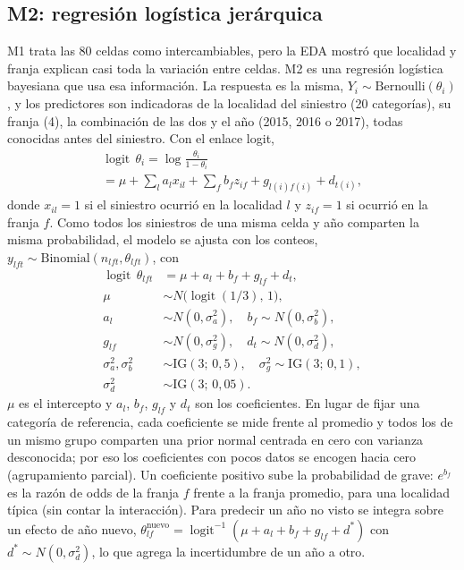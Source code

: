 \documentclass[10pt,twocolumn]{article}
\newcommand{\logit}{\operatorname{logit}}
\newcommand{\expit}{\operatorname{logit}^{-1}}
\begin{document}
\subsection{M2: regresión logística jerárquica}
M1 trata las 80 celdas como intercambiables, pero la EDA mostró que localidad y franja explican casi toda la variación entre celdas. M2 es una regresión logística bayesiana que usa esa información. La respuesta es la misma, $Y_i\sim\mathrm{Bernoulli}(\theta_i)$, y los predictores son indicadoras de la localidad del siniestro (20 categorías), su franja (4), la combinación de las dos y el año (2015, 2016 o 2017), todas conocidas antes del siniestro. Con el enlace logit,
\begin{multline}
\logit\,\theta_i=\log\frac{\theta_i}{1-\theta_i}\\
=\mu+\sum_{l}a_l x_{il}+\sum_{f}b_f z_{if}+g_{l(i)f(i)}+d_{t(i)},\label{eq:m2i}
\end{multline}
donde $x_{il}=1$ si el siniestro ocurrió en la localidad $l$ y $z_{if}=1$ si ocurrió en la franja $f$. Como todos los siniestros de una misma celda y año comparten la misma probabilidad, el modelo se ajusta con los conteos, $y_{lft}\sim\mathrm{Binomial}(n_{lft},\theta_{lft})$, con
\begin{align}
\logit\,\theta_{lft}&=\mu+a_l+b_f+g_{lf}+d_t,\label{eq:m2}\\
\mu&\sim N\big(\logit(1/3),\,1\big),\nonumber\\
a_l&\sim N(0,\sigma_a^2),\quad b_f\sim N(0,\sigma_b^2),\nonumber\\
g_{lf}&\sim N(0,\sigma_g^2),\quad d_t\sim N(0,\sigma_d^2),\nonumber\\
\sigma_a^2,\sigma_b^2&\sim\mathrm{IG}(3;\,0{,}5),\quad \sigma_g^2\sim\mathrm{IG}(3;\,0{,}1),\nonumber\\
\sigma_d^2&\sim\mathrm{IG}(3;\,0{,}05).\nonumber
\end{align}
$\mu$ es el intercepto y $a_l$, $b_f$, $g_{lf}$ y $d_t$ son los coeficientes. En lugar de fijar una categoría de referencia, cada coeficiente se mide frente al promedio y todos los de un mismo grupo comparten una prior normal centrada en cero con varianza desconocida; por eso los coeficientes con pocos datos se encogen hacia cero (agrupamiento parcial). Un coeficiente positivo sube la probabilidad de grave: $e^{b_f}$ es la razón de odds de la franja $f$ frente a la franja promedio, para una localidad típica (sin contar la interacción). Para predecir un año no visto se integra sobre un efecto de año nuevo, $\theta^{\mathrm{nuevo}}_{lf}=\expit(\mu+a_l+b_f+g_{lf}+d^{*})$ con $d^{*}\sim N(0,\sigma_d^2)$, lo que agrega la incertidumbre de un año a otro.
\end{document}
